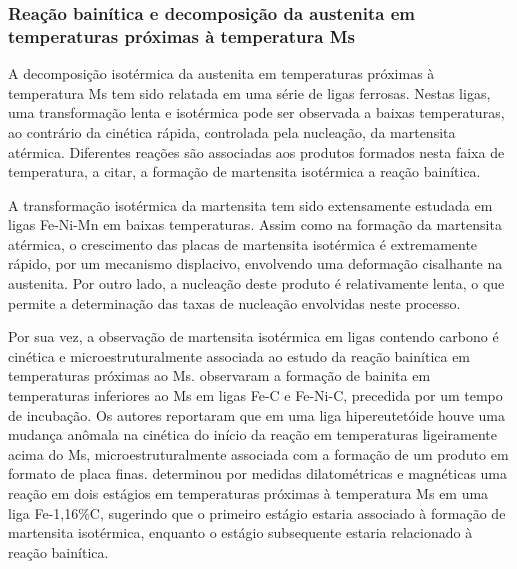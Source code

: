 

\subsubsection{Reação bainítica e decomposição da austenita em temperaturas próximas à temperatura Ms}

\label{subsec:decompMs}

A decomposição isotérmica da austenita em temperaturas próximas à temperatura Ms tem sido relatada em uma série de ligas ferrosas. Nestas ligas, uma transformação lenta e isotérmica pode ser observada a baixas temperaturas, ao contrário da cinética rápida, controlada pela nucleação, da martensita atérmica. Diferentes reações são associadas aos produtos formados nesta faixa de temperatura, a citar, a formação de martensita isotérmica a reação bainítica.

A transformação isotérmica da martensita tem sido extensamente estudada em ligas Fe-Ni-Mn em baixas temperaturas\cite{Kaufman1958,Pati1969}. Assim como na formação da martensita atérmica, o crescimento das placas de martensita isotérmica é extremamente rápido, por um mecanismo displacivo, envolvendo uma deformação cisalhante na austenita. Por outro lado, a nucleação deste produto é relativamente lenta, o que permite a determinação das taxas de nucleação envolvidas neste processo\cite{Pati1969}. 

Por sua vez, a observação de martensita isotérmica em ligas contendo carbono é cinética e microestruturalmente associada ao estudo da reação bainítica em temperaturas próximas ao Ms.  observaram a formação de bainita em temperaturas inferiores ao Ms em ligas Fe-C e Fe-Ni-C, precedida por um tempo de incubação. Os autores reportaram que em uma liga hipereutetóide houve uma mudança anômala na cinética do início da reação em temperaturas ligeiramente acima do Ms, microestruturalmente associada com a formação de um produto em formato de placa finas.  determinou por medidas dilatométricas e magnéticas uma reação em dois estágios em temperaturas próximas à temperatura Ms em uma liga Fe-1,16\%C, sugerindo que o primeiro estágio estaria associado à formação de martensita isotérmica, enquanto o estágio subsequente estaria relacionado à reação bainítica.

